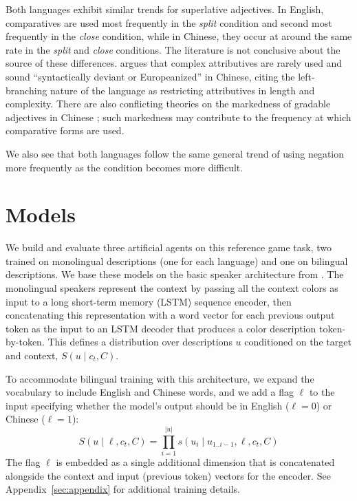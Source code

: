 \documentclass[11pt,a4paper]{article}
\renewcommand{\|}{\mid}
\begin{document}
Both languages exhibit similar trends for superlative adjectives. In English, comparatives are used most frequently in the \emph{split} condition and second most frequently in the \emph{close} condition, while in Chinese, they occur at around the same rate in the \emph{split} and \emph{close} conditions. The literature is not conclusive about the source of these differences. \citet{Xia:2014} argues that complex attributives are rarely used and sound ``syntactically deviant or Europeanized'' \citep{Zhu:1982,Xie:2001} in Chinese, citing the left-branching nature of the language as restricting attributives in length and complexity. There are also conflicting theories on the markedness of gradable adjectives in Chinese \citep{Grano:2012,Ito:2008}; such markedness may contribute to the frequency at which comparative forms are used.

We also see that both languages follow the same general trend of using negation more frequently as the condition becomes more difficult.

\section{Models}\label{sec:models}

We build and evaluate three artificial agents on this reference game task, two trained
on monolingual descriptions (one for each language) and one on bilingual descriptions.
We base these models on the basic speaker architecture
from \citet{Monroe2017}. The monolingual speakers 
represent the context by passing all the
context colors as input to a long short-term memory (LSTM) sequence encoder, then concatenating
this representation with a word vector for
each previous output token as the input to an LSTM decoder that produces a color description token-by-token. This defines a distribution over descriptions $u$ conditioned on the target and context, $S(u \| c_t, C)$.

To accommodate bilingual training with this architecture, we expand the
vocabulary to include English and Chinese words, and we add a flag $\ell$ to the input specifying whether the model's
output should be in English ($\ell = 0$) or Chinese ($\ell = 1$):
\[S(u \| \ell, c_t, C) = \prod_{i=1}^{|u|} s(u_i \| u_{1..i-1}, \ell, c_t, C)\]
The flag $\ell$ is embedded as a single additional dimension that is concatenated alongside the context and input (previous token)
vectors for the encoder. See Appendix~\ref{sec:appendix} for additional training details.
\end{document}
